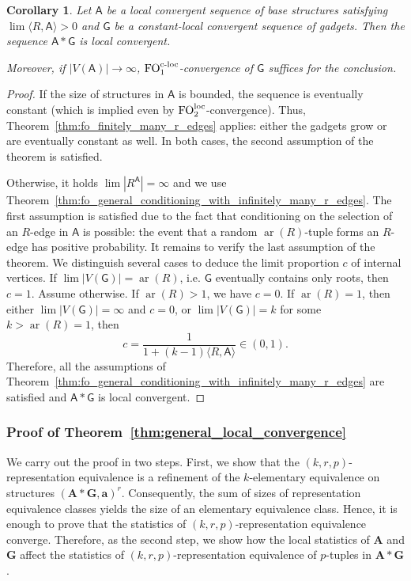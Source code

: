 \documentclass[11pt]{article}
\theoremstyle{plain}
\newtheorem{corollary}[theorem]{Corollary}
\theoremstyle{definition}
\theoremstyle{remark}
\DeclareMathOperator\aritysym{ar}
\newcommand{\arity}[1]{{\aritysym({#1})}}
\DeclareMathOperator\FO{FO}
\newcommand{\FOloc}[1]{\FO_{#1}^\textnormal{loc}}
\newcommand{\FOcloc}[1]{\FO_{#1}^{\textnormal{c-loc}}}
\newcommand{\stonepar}[2]{\langle #1, #2 \rangle}
\newcommand{\str}[1]{\mathbf{#1}}
\newcommand{\strseq}[1]{{\boldsymbol{\mathsf{#1}}}}
\newcommand{\tpl}[1]{{\bm{#1}}}
\begin{document}
\begin{corollary}\label{cor:fo_dense_edges}
    Let $\strseq{A}$ be a local convergent sequence of base structures satisfying $\lim \stonepar{R}{\strseq{A}} > 0$ and $\strseq{G}$ be a constant-local convergent sequence of gadgets.
    Then the sequence $\strseq{A}*\strseq{G}$ is local convergent.
    
    Moreover, if $|V(\strseq{A})| \to \infty$, $\FOcloc{1}$-convergence of $\strseq{G}$ suffices for the conclusion.
\end{corollary}
\begin{proof}
    If the size of structures in $\strseq{A}$ is bounded, the sequence is eventually constant (which is implied even by $\FOloc{2}$-convergence).
    Thus, Theorem~\ref{thm:fo_finitely_many_r_edges} applies: either the gadgets grow or are eventually constant as well.
    In both cases, the second assumption of the theorem is satisfied.
    
    Otherwise, it holds $\lim |R^\strseq{A}| = \infty$ and we use Theorem~\ref{thm:fo_general_conditioning_with_infinitely_many_r_edges}.
    The first assumption is satisfied due to the fact that conditioning on the selection of an $R$-edge in $\strseq{A}$ is possible:
    the event that a random $\arity{R}$-tuple forms an $R$-edge has positive probability.
    It remains to verify the last assumption of the theorem.
    We distinguish several cases to deduce the limit proportion $c$ of internal vertices.
    If $\lim |V(\strseq{G})| = \arity{R}$, i.e. $\strseq{G}$ eventually contains only roots, then $c = 1$.
    Assume otherwise.
    If $\arity{R} > 1$, we have $c = 0$.
    If $\arity{R} = 1$, then either $\lim |V(\strseq{G})| = \infty$ and $c = 0$, or $\lim |V(\strseq{G})| = k$ for some $k > \arity{R} = 1$, then
    \[
        c = \frac{1}{1 + (k-1)\stonepar{R}{\strseq{A}}} \in (0,1)
        .
    \]
    Therefore, all the assumptions of Theorem~\ref{thm:fo_general_conditioning_with_infinitely_many_r_edges} are satisfied and $\strseq{A}*\strseq{G}$ is local convergent.
\end{proof}

\subsubsection{Proof of Theorem~\ref{thm:general_local_convergence}}\label{sssec:proof_of_general_local_convergence}

We carry out the proof in two steps.
First, we show that the $(k,r,p)$-representation equivalence is a refinement of the $k$-elementary equivalence on structures $(\str{A} * \str{G}, \tpl{a})^r$.
Consequently, the sum of sizes of representation equivalence classes yields the size of an elementary equivalence class.
Hence, it is enough to prove that the statistics of $(k,r,p)$-representation equivalence converge.
Therefore, as the second step, we show how the local statistics of $\str{A}$ and $\str{G}$ affect the statistics of $(k,r,p)$-representation equivalence of $p$-tuples in $\str{A}*\str{G}$.
\end{document}
